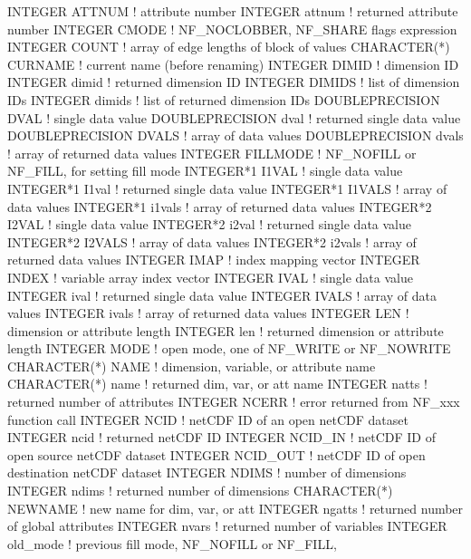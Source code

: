 \begin{DoxyCode}
INTEGER       ATTNUM       ! attribute number
INTEGER       attnum       ! returned attribute number
INTEGER       CMODE        ! NF\_NOCLOBBER, NF\_SHARE flags expression
INTEGER       COUNT        ! array of edge lengths of block of values
CHARACTER(*)  CURNAME      ! current name (before renaming)
INTEGER       DIMID        ! dimension ID
INTEGER       dimid        ! returned dimension ID
INTEGER       DIMIDS       ! list of dimension IDs
INTEGER       dimids       ! list of returned dimension IDs
DOUBLEPRECISION  DVAL      ! single data value
DOUBLEPRECISION  dval      ! returned single data value
DOUBLEPRECISION  DVALS     ! array of data values
DOUBLEPRECISION  dvals     ! array of returned data values
INTEGER       FILLMODE     ! NF\_NOFILL or NF\_FILL, for setting fill mode
INTEGER*1     I1VAL        ! single data value
INTEGER*1     I1val        ! returned single data value
INTEGER*1     I1VALS       ! array of data values
INTEGER*1     i1vals       ! array of returned data values
INTEGER*2     I2VAL        ! single data value
INTEGER*2     i2val        ! returned single data value
INTEGER*2     I2VALS       ! array of data values
INTEGER*2     i2vals       ! array of returned data values
INTEGER       IMAP         ! index mapping vector
INTEGER       INDEX        ! variable array index vector
INTEGER       IVAL         ! single data value
INTEGER       ival         ! returned single data value
INTEGER       IVALS        ! array of data values
INTEGER       ivals        ! array of returned data values
INTEGER       LEN          ! dimension or attribute length
INTEGER       len          ! returned dimension or attribute length
INTEGER       MODE         ! open mode, one of NF\_WRITE or NF\_NOWRITE
CHARACTER(*)  NAME         ! dimension, variable, or attribute name
CHARACTER(*)  name         ! returned dim, var, or att name
INTEGER       natts        ! returned number of attributes
INTEGER       NCERR        ! error returned from NF\_xxx function call
INTEGER       NCID         ! netCDF ID of an open netCDF dataset
INTEGER       ncid         ! returned netCDF ID
INTEGER       NCID\_IN      ! netCDF ID of open source netCDF dataset
INTEGER       NCID\_OUT     ! netCDF ID of open destination netCDF dataset
INTEGER       NDIMS        ! number of dimensions
INTEGER       ndims        ! returned number of dimensions
CHARACTER(*)  NEWNAME      ! new name for dim, var, or att
INTEGER       ngatts       ! returned number of global attributes
INTEGER       nvars        ! returned number of variables
INTEGER       old\_mode     ! previous fill mode, NF\_NOFILL or NF\_FILL,

\end{DoxyCode}
